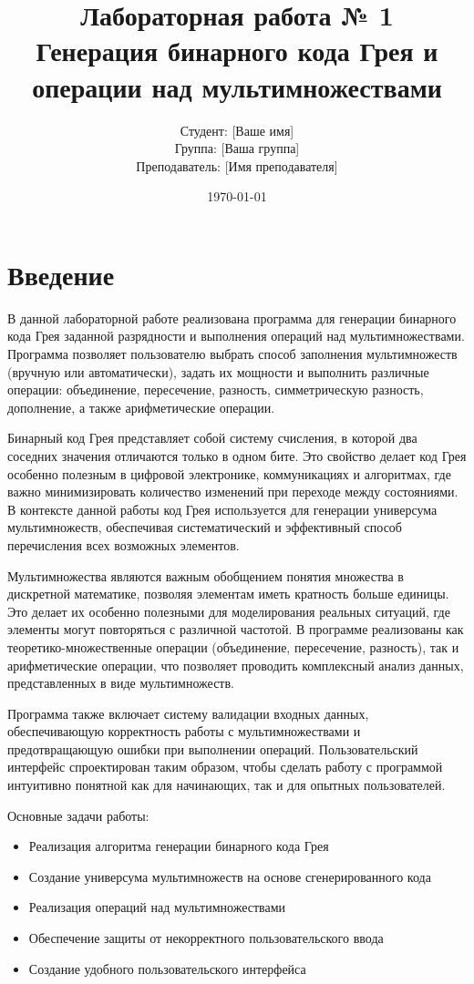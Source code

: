 \documentclass[12pt,a4paper]{article}
\title{\textbf{Лабораторная работа № 1}\\
\large{Генерация бинарного кода Грея и операции над мультимножествами}}
\author{Студент: [Ваше имя]\\
Группа: [Ваша группа]\\
Преподаватель: [Имя преподавателя]}
\date{\today}
\begin{document}
\maketitle
\thispagestyle{empty}
\newpage

\tableofcontents
\newpage

\section{Введение}

В данной лабораторной работе реализована программа для генерации бинарного кода Грея заданной разрядности и выполнения операций над мультимножествами. Программа позволяет пользователю выбрать способ заполнения мультимножеств (вручную или автоматически), задать их мощности и выполнить различные операции: объединение, пересечение, разность, симметрическую разность, дополнение, а также арифметические операции.

Бинарный код Грея представляет собой систему счисления, в которой два соседних значения отличаются только в одном бите. Это свойство делает код Грея особенно полезным в цифровой электронике, коммуникациях и алгоритмах, где важно минимизировать количество изменений при переходе между состояниями. В контексте данной работы код Грея используется для генерации универсума мультимножеств, обеспечивая систематический и эффективный способ перечисления всех возможных элементов.

Мультимножества являются важным обобщением понятия множества в дискретной математике, позволяя элементам иметь кратность больше единицы. Это делает их особенно полезными для моделирования реальных ситуаций, где элементы могут повторяться с различной частотой. В программе реализованы как теоретико-множественные операции (объединение, пересечение, разность), так и арифметические операции, что позволяет проводить комплексный анализ данных, представленных в виде мультимножеств.

Программа также включает систему валидации входных данных, обеспечивающую корректность работы с мультимножествами и предотвращающую ошибки при выполнении операций. Пользовательский интерфейс спроектирован таким образом, чтобы сделать работу с программой интуитивно понятной как для начинающих, так и для опытных пользователей.

Основные задачи работы:
\begin{itemize}
    \item Реализация алгоритма генерации бинарного кода Грея
    \item Создание универсума мультимножеств на основе сгенерированного кода
    \item Реализация операций над мультимножествами
    \item Обеспечение защиты от некорректного пользовательского ввода
    \item Создание удобного пользовательского интерфейса
\end{itemize}
\end{document}

